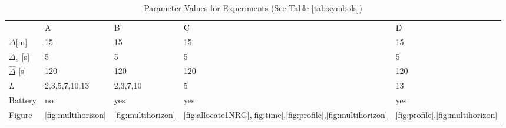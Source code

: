 \begin{table}[ht]    
\caption{Parameter Values for Experiments (See Table \ref{tab:symbols})}
\label{table:test-parameters}  
\centering
\begin{tabular}{lllll}
& A  & B  & C  & D     \\ \cline{2-5} 
\multicolumn{1}{l|}{$\Delta$[m]}   & 15 & 15 & 15 & 15   \\
\multicolumn{1}{l|}{$\Delta_s$ [s]}   & 5 & 5 & 5 & 5   \\
\multicolumn{1}{l|}{$\hat{\Delta}$ [s]} & 120 & 120 & 120 & 120   \\
\multicolumn{1}{l|}{$L$}          & 2,3,5,7,10,13  & 2,3,7,10  & 5  & 13    \\
\multicolumn{1}{l|}{Battery}     & no & yes & yes & yes \\
\hline
\multicolumn{1}{l|}{Figure}     & \ref{fig:multihorizon} &\ref{fig:multihorizon} & \ref{fig:allocate1NRG},\ref{fig:time},\ref{fig:profile},\ref{fig:multihorizon} &  \ref{fig:profile},\ref{fig:multihorizon} 
\end{tabular}
\end{table}

